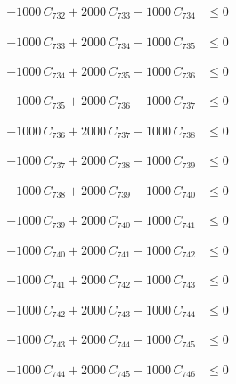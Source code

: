 \documentclass[a4paper,11pt]{article}
\begin{document}
\begin{align}
-1000\,C_{732} + 2000\,C_{733} - 1000\,C_{734} &\leq 0 \nonumber
\end{align}

\begin{align}
-1000\,C_{733} + 2000\,C_{734} - 1000\,C_{735} &\leq 0 \nonumber
\end{align}

\begin{align}
-1000\,C_{734} + 2000\,C_{735} - 1000\,C_{736} &\leq 0 \nonumber
\end{align}

\begin{align}
-1000\,C_{735} + 2000\,C_{736} - 1000\,C_{737} &\leq 0 \nonumber
\end{align}

\begin{align}
-1000\,C_{736} + 2000\,C_{737} - 1000\,C_{738} &\leq 0 \nonumber
\end{align}

\begin{align}
-1000\,C_{737} + 2000\,C_{738} - 1000\,C_{739} &\leq 0 \nonumber
\end{align}

\begin{align}
-1000\,C_{738} + 2000\,C_{739} - 1000\,C_{740} &\leq 0 \nonumber
\end{align}

\begin{align}
-1000\,C_{739} + 2000\,C_{740} - 1000\,C_{741} &\leq 0 \nonumber
\end{align}

\begin{align}
-1000\,C_{740} + 2000\,C_{741} - 1000\,C_{742} &\leq 0 \nonumber
\end{align}

\begin{align}
-1000\,C_{741} + 2000\,C_{742} - 1000\,C_{743} &\leq 0 \nonumber
\end{align}

\begin{align}
-1000\,C_{742} + 2000\,C_{743} - 1000\,C_{744} &\leq 0 \nonumber
\end{align}

\begin{align}
-1000\,C_{743} + 2000\,C_{744} - 1000\,C_{745} &\leq 0 \nonumber
\end{align}

\begin{align}
-1000\,C_{744} + 2000\,C_{745} - 1000\,C_{746} &\leq 0 \nonumber
\end{align}
\end{document}
